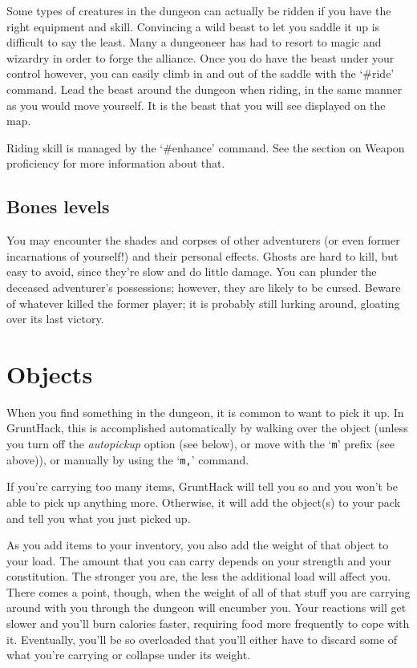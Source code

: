 Some types of creatures in the dungeon can actually be ridden if you
have the right equipment and skill.  Convincing a wild beast to let
you saddle it up is difficult to say the least.  Many a dungeoneer 
has had to resort to magic and wizardry in order to forge the alliance.
Once you do have the beast under your control however, you can 
easily climb in and out of the saddle with the `\#ride' command.  Lead
the beast around the dungeon when riding, in the same manner as 
you would move yourself.  It is the beast that you will see displayed
on the map.

Riding skill is managed by the `\#enhance' command.  See the section
on Weapon proficiency for more information about that.
\subsection*{Bones levels}

You may encounter the shades and corpses of other adventurers (or even
former incarnations of yourself!) and their personal effects.  Ghosts
are hard to kill, but easy to avoid, since they're slow and do little
damage.  You can plunder the deceased adventurer's possessions;
however, they are likely to be cursed.  Beware of whatever killed the
former player; it is probably still lurking around, gloating over its
last victory.

\section{Objects}

When you find something in the dungeon, it is common to want to pick
it up.  In GruntHack, this is accomplished automatically by walking over
the object (unless you turn off the
{\it autopickup }
option (see below), or move with the `{\tt m}' prefix (see above)), or
manually by using the `{\tt m,}' command.

If you're carrying too many items, GruntHack will tell you so and you won't 
be able to pick
up anything more.  Otherwise, it will add the object(s) to your pack and tell
you what you just picked up.

As you add items to your inventory, you also add the weight of that object
to your load.  The amount that you can carry depends on your strength and
your constitution.  The
stronger you are, the less the additional load will affect you.  There comes
a point, though, when the weight of all of that stuff you are carrying around
with you through the dungeon will encumber you.  Your reactions
will get slower and you'll burn calories faster, requiring food more frequently
to cope with it.  Eventually, you'll be so overloaded that you'll either have
to discard some of what you're carrying or collapse under its weight.

